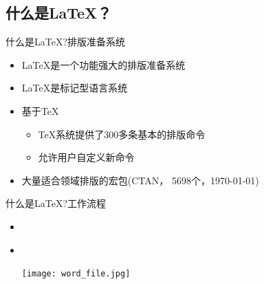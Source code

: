 \documentclass[fontset = none, xcolor=svgnames, t, aspectratio=169]{ctexbeamer}
\begin{document}
\subsection[是什么？]{什么是\LaTeX ？}\label{sec01-02}
\begin{frame}[t]{什么是\LaTeX?}{排版准备系统}
  \stretchon
  \begin{itemize}
  \item \LaTeX{}是一个功能强大的排版准备系统
  \item \LaTeX{}是标记型语言系统
  \item 基于\TeX
    \begin{itemize}
    \item \TeX{}系统提供了300多条基本的排版命令
    \item 允许用户自定义新命令
    \end{itemize}
  \item 大量适合领域排版的宏包(CTAN，
    \alert{5698}个，\today )
  \end{itemize}
  \stretchoff
\end{frame}

\begin{frame}[t]{什么是\LaTeX?}{工作流程}
  \begin{itemize}
  \item \wysiwym\\[4ex]
    \begin{center}
    \end{center}
    \vspace{4ex}
  \item \wysiwyg\\[4ex]
    \begin{center}
      \texttt{[image: word\_file.jpg]}
    \end{center}
  \end{itemize}
\end{frame}
\end{document}
